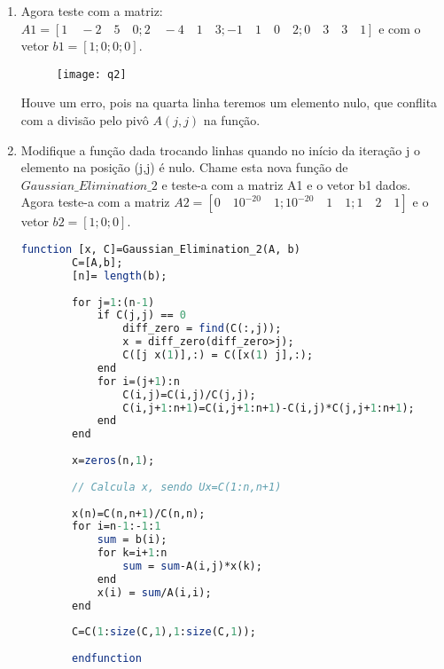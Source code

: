 \documentclass[leqno]{article}
\numberwithin{equation}{section}
\begin{document}
\begin{enumerate}

\item Agora teste com a matriz: $A1 = [1\quad -2 \quad 5 \quad 0; 2 \quad -4 \quad 1 \quad 3; -1 \quad 1 \quad 0 \quad 2; 0 \quad 3 \quad 3 \quad 1]$ e com o vetor $b1=[1;0;0;0]$.

\begin{sol}

	\begin{figure}[H]
		\centering
		\texttt{[image: q2]}
	\end{figure}
	
Houve um erro, pois na quarta linha teremos um elemento nulo, que conflita com a divisão pelo pivô $A(j,j)$ na função.
\end{sol}


\item Modifique a função dada trocando linhas quando no início da iteração j o 
elemento na posição (j,j) é nulo. Chame esta nova função de 
$Gaussian\_Elimination\_2$ e teste-a com a matriz A1 e o vetor b1 dados.
Agora teste-a com a matriz $A2=[0 \quad 10^{-20} \quad 1; 10^{-20} \quad 1 \quad 1; 1 \quad 2 \quad 1]$ e o vetor $b2=[1; 0; 0]$.

\begin{sol}
	\begin{lstlisting}[language=Scilab]
		function [x, C]=Gaussian_Elimination_2(A, b) 
		C=[A,b];   
		[n]= length(b); 
		
		for j=1:(n-1)
			if C(j,j) == 0	
				diff_zero = find(C(:,j));
				x = diff_zero(diff_zero>j);
				C([j x(1)],:) = C([x(1) j],:);	
			end
			for i=(j+1):n 
				C(i,j)=C(i,j)/C(j,j); 
				C(i,j+1:n+1)=C(i,j+1:n+1)-C(i,j)*C(j,j+1:n+1); 				
			end 
		end 
			
		x=zeros(n,1); 		
		
		// Calcula x, sendo Ux=C(1:n,n+1) 
		
		x(n)=C(n,n+1)/C(n,n); 
		for i=n-1:-1:1 
			sum = b(i);
			for k=i+1:n
				sum = sum-A(i,j)*x(k);
			end
			x(i) = sum/A(i,i); 
		end 
		
		C=C(1:size(C,1),1:size(C,1)); 
		
		endfunction
	\end{lstlisting}


\end{sol}
\end{enumerate}
\end{document}
